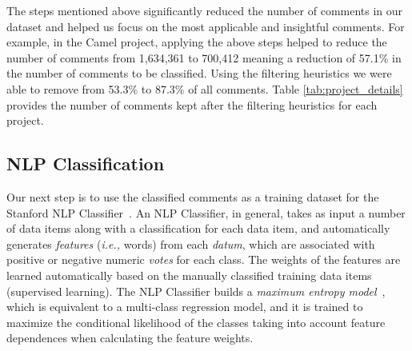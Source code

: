 The steps mentioned above significantly reduced the number of comments in our dataset and helped us focus on the most applicable and insightful comments.  For example, in the Camel project, applying the above steps helped to reduce the number of comments from 1,634,361 to 700,412 meaning a reduction of 57.1\% in the number of comments to be classified.  Using the filtering heuristics we were able to remove from 53.3\% to 87.3\% of all comments. Table \ref{tab:project_details} provides the number of comments kept after the filtering heuristics for each project.


\subsection{NLP Classification}
\label{sub:nlp_classification}

Our next step is to use the classified \SATD comments as a training dataset for the Stanford NLP Classifier~\cite{Manning2014ACL}.
An NLP Classifier, in general, takes as input a number of data items along with a classification for each data item, and automatically generates \textit{features} (\textit{i.e.,} words) from each \textit{datum}, which are associated with positive or negative numeric \textit{votes} for each class. The weights of the features are learned automatically based on the manually classified training data items (supervised learning). The NLP Classifier builds a \textit{maximum entropy model}~\cite{nigam1999using}, which is equivalent to a multi-class regression model, and it is trained to maximize the conditional likelihood of the classes taking into account feature dependences when calculating the feature weights.

